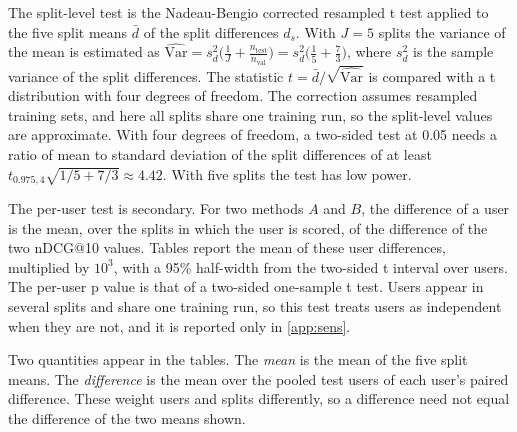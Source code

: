 \documentclass[preprint,12pt,authoryear]{elsarticle}
\begin{document}
The split-level test is the Nadeau-Bengio corrected resampled t test \citep{nadeau2003} applied to the five split means $\bar d$ of the split
differences $d_s$. With $J=5$ splits the variance of the mean is estimated as
$\widehat{\mathrm{Var}}=s_d^2\bigl(\tfrac1J+\tfrac{n_{\mathrm{test}}}{n_{\mathrm{val}}}\bigr)=s_d^2\bigl(\tfrac15+\tfrac73\bigr)$, where $s_d^2$ is the
sample variance of the split differences. The statistic $t=\bar d/\sqrt{\widehat{\mathrm{Var}}}$ is compared with a t distribution with four
degrees of freedom. The correction assumes resampled training sets, and here all splits share one training run, so the split-level values are
approximate. With four degrees of freedom, a two-sided test at 0.05 needs a ratio of mean to standard deviation of the split differences of at
least $t_{0.975,4}\sqrt{1/5+7/3}\approx4.42$. With five splits the test has low power.

The per-user test is secondary. For two methods $A$ and $B$, the difference of a user is the mean, over the splits in which the user is scored,
of the difference of the two nDCG@10 values. Tables report the mean of these user differences, multiplied by $10^{3}$, with a 95\% half-width from
the two-sided t interval over users. The per-user p value is that of a two-sided one-sample t test. Users appear in several splits and share one
training run, so this test treats users as independent when they are not, and it is reported only in \ref{app:sens}.

Two quantities appear in the tables. The \emph{mean} is the mean of the five split means. The \emph{difference} is the mean over the pooled test
users of each user's paired difference. These weight users and splits differently, so a difference need not equal the difference of the two means
shown.
\end{document}
